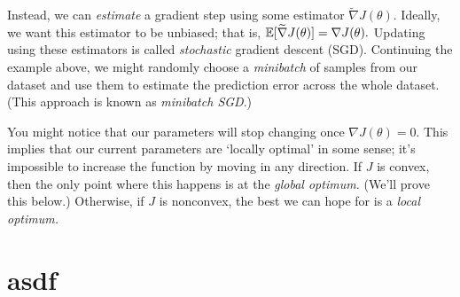 \documentclass[../main/main]{subfiles}
\begin{document}
Instead, we can \emph{estimate} a gradient step using some estimator $\tilde \nabla J(\theta).$ Ideally, we want this estimator to be unbiased; that is, $\operatorname*{\mathbb{E}} [\widetilde \nabla J(\theta)] = \nabla J(\theta).$ Updating using these estimators is called \emph{stochastic} gradient descent (SGD). Continuing the example above, we might randomly choose a \emph{minibatch} of samples from our dataset and use them to estimate the prediction error across the whole dataset. (This approach is known as \emph{minibatch SGD}.)

You might notice that our parameters will stop changing once $\nabla J(\theta) = 0.$ This implies that our current parameters are `locally optimal' in some sense; it's impossible to increase the function by moving in any direction. If $J$ is convex, then the only point where this happens is at the \emph{global optimum.} (We'll prove this below.) Otherwise, if $J$ is nonconvex, the best we can hope for is a \emph{local optimum.}



\section{asdf}
\end{document}
